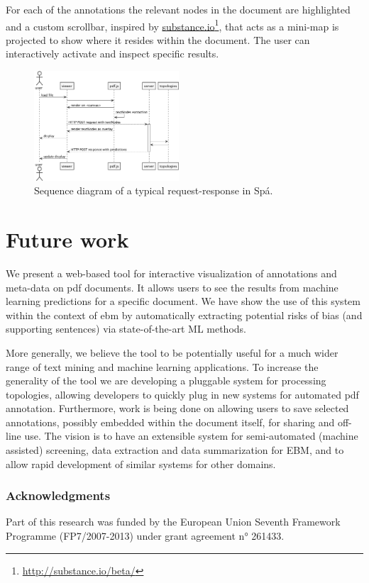 \documentclass[runningheads,a4paper]{llncs}
\begin{document}
For each of the annotations the relevant nodes in the document are highlighted and a custom scrollbar, inspired by \href{http://substance.io/}{substance.io}\footnote{\url{http://substance.io/beta/}}, that acts as a mini-map is projected to show where it resides within the document.
The user can interactively activate and inspect specific results.
\label{section:architecture}
\begin{figure}
  \begin{center}
    \includegraphics[width=0.48\textwidth]{./diagrams/sequence.pdf}
  \end{center}
  \caption{\label{fig:sequence}Sequence diagram of a typical request-response in Spá.}
\end{figure}

\section{Future work}
We present a web-based tool for interactive visualization of annotations and meta-data on \ac{pdf} documents.
It allows users to see the results from machine learning predictions for a specific document.
We have show the use of this system within the context of \ac{ebm} by automatically extracting potential risks of bias (and supporting sentences) via state-of-the-art ML methods.

More generally, we believe the tool to be potentially useful for a much wider range of text mining and machine learning applications.
To increase the generality of the tool we are developing a pluggable system for processing topologies, allowing developers to quickly plug in new systems for automated \ac{pdf} annotation.
Furthermore, work is being done on allowing users to save selected annotations, possibly embedded within the document itself, for sharing and off-line use.
The vision is to have an extensible system for semi-automated (machine assisted) screening, data extraction and data summarization for EBM, and to allow rapid development of similar systems for other domains.

\subsubsection{Acknowledgments}
Part of this research was funded by the European Union Seventh Framework Programme (FP7/2007-2013) under grant agreement n° 261433. %



\end{document}
